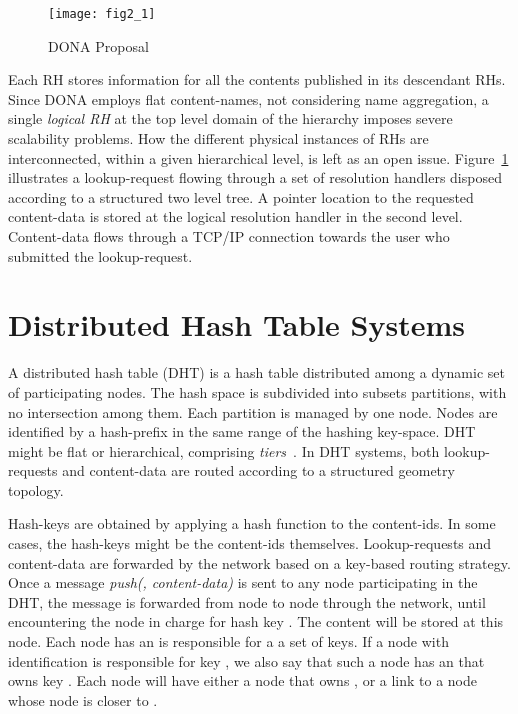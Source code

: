 \begin{figure}[h!]
\center
\texttt{[image: fig2\_1]}
\caption{DONA Proposal}
\label{donasystem}
\end{figure}


Each RH stores information for all the contents published in its descendant RHs. 
Since DONA employs flat content-names, not considering name aggregation, a 
single \emph{logical RH} at the top level domain of the hierarchy imposes severe scalability problems. How
the different physical instances of RHs are interconnected, within a given hierarchical level, is left as an open issue.
Figure~\ref{donasystem} illustrates a lookup-request flowing through a set of resolution handlers disposed according to a structured
two level tree. A pointer location to the requested content-data is stored at the logical 
resolution handler in the second level. Content-data flows through a TCP/IP connection towards the user who submitted
the lookup-request. 






\section{Distributed Hash Table Systems}


A distributed hash table (DHT) is a hash table distributed among a dynamic set of participating
nodes. The hash space is subdivided into subsets partitions, with no intersection among them. 
Each partition is managed by one node.  Nodes are identified by a hash-prefix  in the same range of the hashing key-space. 
DHT might be flat or hierarchical, comprising \emph{tiers}~\cite{canon}.  In DHT systems, both lookup-requests 
and content-data are routed according to a structured geometry topology. 


Hash-keys are obtained by applying a hash function to the content-ids.  In some cases, the hash-keys might be the content-ids themselves.
 Lookup-requests 
and content-data are forwarded by the network based on a key-based routing strategy. Once a message \emph{push(, content-data)} 
is sent to any node participating in the DHT, the message is forwarded from node to 
node through the network, until encountering the node in charge for hash key . The content will be stored at this node. Each node has an  is responsible for a a set of 
keys.  If a node with identification  is responsible for key , we also say that such a node has an  that owns key .
 Each node will have either a node  that owns , 
or a link to a node whose node  is closer to . 


